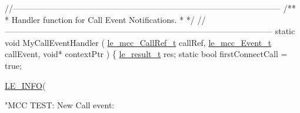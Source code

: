\begin{DoxyCodeInclude}
\textcolor{comment}{//--------------------------------------------------------------------------------------------------}\textcolor{comment}{}
\textcolor{comment}{/**}
\textcolor{comment}{ * Handler function for Call Event Notifications.}
\textcolor{comment}{ *}
\textcolor{comment}{ */}
\textcolor{comment}{//--------------------------------------------------------------------------------------------------}
\textcolor{keyword}{static} \textcolor{keywordtype}{void} MyCallEventHandler
(
    \hyperlink{le__mcc__interface_8h_a8ae6dac3ca12854884d63e17d5388a7a}{le\_mcc\_CallRef\_t}  callRef,
    \hyperlink{le__mcc__interface_8h_aefc4679ffa76d0e04c578572c22f06cf}{le\_mcc\_Event\_t} callEvent,
    \textcolor{keywordtype}{void}* contextPtr
)
\{
    \hyperlink{le__basics_8h_a1cca095ed6ebab24b57a636382a6c86c}{le\_result\_t}         res;
    \textcolor{keyword}{static} \textcolor{keywordtype}{bool} firstConnectCall = \textcolor{keyword}{true};

    \hyperlink{le__log_8h_a23e6d206faa64f612045d688cdde5808}{LE\_INFO}(\textcolor{stringliteral}{"MCC TEST: New Call event: %

}
\end{DoxyCodeInclude}
